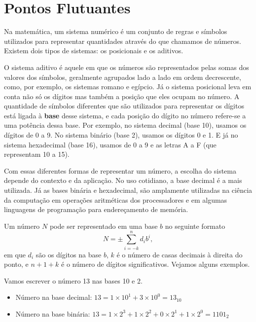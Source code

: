 \chapter{Pontos Flutuantes}


Na matemática, %
um sistema numérico é um conjunto de regras e símbolos utilizados para representar quantidades através do que chamamos de números. %
Existem dois tipos de sistemas: os posicionais e os aditivos. 

O sistema aditivo é aquele em que os números são representados pelas somas dos valores dos símbolos, geralmente agrupados lado a lado em ordem decrescente, como, por exemplo, os sistemas romano e egípcio. Já o sistema posicional leva em conta não só os dígitos mas também a posição que eles ocupam no número. %
A quantidade de símbolos diferentes que são utilizados para representar os dígitos está ligada à \textbf{base} desse sistema, e cada posição do dígito no número refere-se a uma potência dessa base. Por exemplo, no sistema decimal (base 10), usamos os dígitos de 0 a 9. No sistema binário (base 2), usamos os dígitos 0 e 1. E já no sistema hexadecimal (base 16), usamos de 0 a 9 e as letras A a F (que representam 10 a 15).

Com essas diferentes formas de representar um número, a escolha do sistema depende do contexto e da aplicação. No uso cotidiano, a base decimal é a mais utilizada. Já as bases binária e hexadecimal, são amplamente utilizadas na ciência da computação em operações aritméticas dos processadores e em algumas linguagens de programação para endereçamento de memória.

Um número $N$ pode ser representado em uma base \(b\) no seguinte formato
\begin{equation}
N = \pm \sum_{i=-k}^{n} d_i b^i,
\end{equation}
em que \(d_i\) são os dígitos na base \(b\), \(k\) é o número de casas decimais à direita do ponto, e \(n+1+k\) é o número de dígitos significativos. Vejamos alguns exemplos.

\begin{ex}
Vamos escrever o número 13 nas bases 10 e 2.
\begin{itemize}
    \item Número na base decimal: $ 13 = 1 \times 10^1 + 3 \times 10^0 = 13_{10}$
    \item Número na base binária: $ 13 = 1 \times 2^3 + 1 \times 2^2 + 0  \times 2^1 + 1 \times 2^0  = 1101_2$
\end{itemize}
\end{ex}

